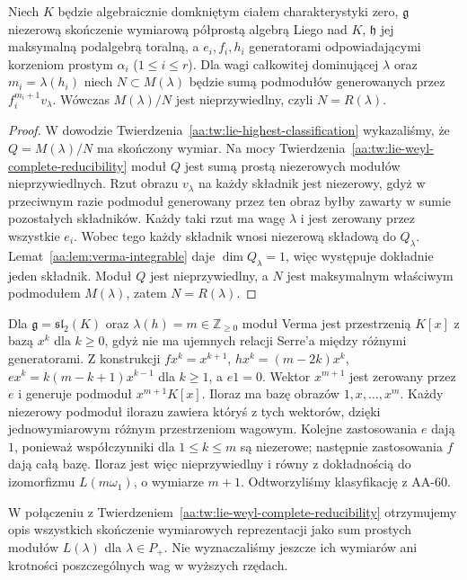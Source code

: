 \begin{wniosek}
\label{aa:cor:verma-integrable-simple}
Niech $K$ będzie algebraicznie domkniętym ciałem charakterystyki zero, $\mathfrak g$ niezerową skończenie wymiarową półprostą algebrą Liego nad $K$, $\mathfrak h$ jej maksymalną podalgebrą toralną, a $e_i,f_i,h_i$ generatorami odpowiadającymi korzeniom prostym $\alpha_i$ ($1\le i\le r$). Dla wagi całkowitej dominującej $\lambda$ oraz $m_i=\lambda(h_i)$ niech $N\subset M(\lambda)$ będzie sumą podmodułów generowanych przez $f_i^{m_i+1}v_\lambda$. Wówczas $M(\lambda)/N$ jest nieprzywiedlny, czyli $N=R(\lambda)$.
\end{wniosek}
\begin{proof}
W dowodzie Twierdzenia~\ref{aa:tw:lie-highest-classification} wykazaliśmy, że $Q=M(\lambda)/N$ ma skończony wymiar. Na mocy Twierdzenia~\ref{aa:tw:lie-weyl-complete-reducibility} moduł $Q$ jest sumą prostą niezerowych modułów nieprzywiedlnych. Rzut obrazu $v_\lambda$ na każdy składnik jest niezerowy, gdyż w przeciwnym razie podmoduł generowany przez ten obraz byłby zawarty w sumie pozostałych składników. Każdy taki rzut ma wagę $\lambda$ i jest zerowany przez wszystkie $e_i$. Wobec tego każdy składnik wnosi niezerową składową do $Q_\lambda$. Lemat~\ref{aa:lem:verma-integrable} daje $\dim Q_\lambda=1$, więc występuje dokładnie jeden składnik. Moduł $Q$ jest nieprzywiedlny, a $N$ jest maksymalnym właściwym podmodułem $M(\lambda)$, zatem $N=R(\lambda)$.
\end{proof}

\begin{przyklad}
\label{aa:prz:verma-sl2}
Dla $\mathfrak g=\mathfrak{sl}_2(K)$ oraz $\lambda(h)=m\in\mathbb Z_{\ge0}$ moduł Verma jest przestrzenią $K[x]$ z bazą $x^k$ dla $k\ge0$, gdyż nie ma ujemnych relacji Serre'a między różnymi generatorami. Z konstrukcji $fx^k=x^{k+1}$, $hx^k=(m-2k)x^k$, $ex^k=k(m-k+1)x^{k-1}$ dla $k\ge1$, a $e1=0$. Wektor $x^{m+1}$ jest zerowany przez $e$ i generuje podmoduł $x^{m+1}K[x]$. Iloraz ma bazę obrazów $1,x,\ldots,x^m$. Każdy niezerowy podmoduł ilorazu zawiera któryś z tych wektorów, dzięki jednowymiarowym różnym przestrzeniom wagowym. Kolejne zastosowania $e$ dają $1$, ponieważ współczynniki dla $1\le k\le m$ są niezerowe; następnie zastosowania $f$ dają całą bazę. Iloraz jest więc nieprzywiedlny i równy z dokładnością do izomorfizmu $L(m\omega_1)$, o wymiarze $m+1$. Odtworzyliśmy klasyfikację z AA-60.
\end{przyklad}

W połączeniu z Twierdzeniem~\ref{aa:tw:lie-weyl-complete-reducibility} otrzymujemy opis wszystkich skończenie wymiarowych reprezentacji jako sum prostych modułów $L(\lambda)$ dla $\lambda\in P_+$. Nie wyznaczaliśmy jeszcze ich wymiarów ani krotności poszczególnych wag w wyższych rzędach.
